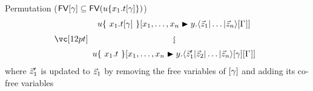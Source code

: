 \documentclass{amsart}
\begin{document}
\bigskip
\bigskip
\bigskip


\noindent
Permutation ($\FV\g\subseteq\FV(u\cxt*{x_1.t\g})$)
\[
\displayrewrite
  { u\cxt*{~x_1.t\g~}\diistr xy{\ttup*z\G} }
  { u\cxt*{~x_1.t~}\diistr xy{\tup*{\vv*z'_1|\vv*z_2|\dotso|\vv*z_n}\g\G} }
\]
where $\vv*z'_1$ is updated to $\vv*z_1$ by removing the free variables of $\g$ and adding its co-free variables
\end{document}
